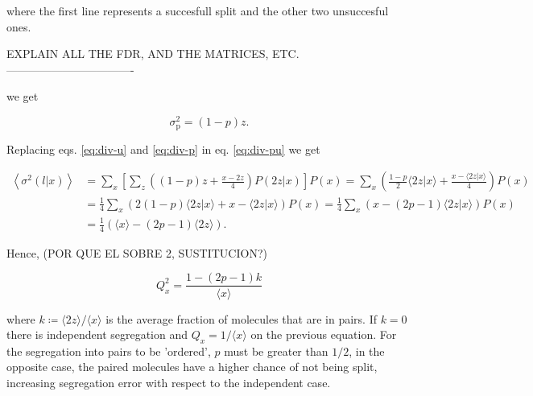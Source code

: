 where the first line represents a succesfull split and the other two unsuccesful ones.

EXPLAIN ALL THE FDR, AND THE MATRICES, ETC.
----------------------------------

we get

\begin{equation}
  \label{eq:div-p}
  \sigma^2_\text{p}=(1-p)z.
\end{equation}

Replacing eqs. \eqref{eq:div-u} and \eqref{eq:div-p} in eq. \eqref{eq:div-pu} we get

\begin{equation}
  \begin{split}
    \left\langle\sigma^2(l|x)\right\rangle &=\sum_{x}\left[\sum_z\left((1-p)z+\frac{x-2z}{4}\right)P(2z|x)\right]P(x) = \sum_x\left(\frac{1-p}{2}\langle 2z|x\rangle+\frac{x-\langle 2z|x\rangle}{4}\right)P(x)\\
    &=\frac{1}{4}\sum_x\left(2(1-p)\langle 2z|x\rangle+x-\langle 2z|x\rangle\right)P(x) = \frac{1}{4}\sum_x\left(x-(2p-1)\langle 2z|x\rangle\right)P(x)\\
    &=\frac{1}{4}\left(\langle x\rangle - (2p-1)\langle 2z\rangle\right).
  \end{split}
\end{equation}

Hence, (POR QUE EL SOBRE 2, SUSTITUCION?)

\begin{equation}
  \boxed{Q_x^2 = \frac{1 - (2p-1)k}{\langle x\rangle}}
\end{equation}

where $k\coloneqq\langle 2z\rangle/\langle x\rangle$ is the average fraction of molecules that are in pairs. If $k=0$ there is independent segregation and $Q_x = 1/\langle x\rangle$ on the previous equation. For the segregation into pairs to be 'ordered', $p$ must be greater than $1/2$, in the opposite case, the paired molecules have a higher chance of not being split, increasing segregation error with respect to the independent case.
